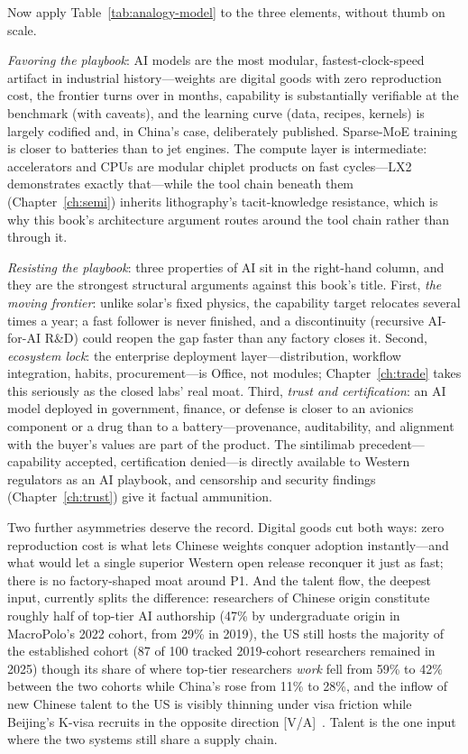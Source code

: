 Now apply Table~\ref{tab:analogy-model} to the three elements, without thumb on scale.

\emph{Favoring the playbook}: AI models are the most modular, fastest-clock-speed artifact in industrial history---weights are digital goods with zero reproduction cost, the frontier turns over in months, capability is substantially verifiable at the benchmark (with caveats), and the learning curve (data, recipes, kernels) is largely codified and, in China's case, deliberately published. Sparse-MoE training is closer to batteries than to jet engines. The compute layer is intermediate: accelerators and CPUs are modular chiplet products on fast cycles---LX2 demonstrates exactly that---while the tool chain beneath them (Chapter~\ref{ch:semi}) inherits lithography's tacit-knowledge resistance, which is why this book's architecture argument routes around the tool chain rather than through it.

\emph{Resisting the playbook}: three properties of AI sit in the right-hand column, and they are the strongest structural arguments against this book's title. First, \emph{the moving frontier}: unlike solar's fixed physics, the capability target relocates several times a year; a fast follower is never finished, and a discontinuity (recursive AI-for-AI R\&D) could reopen the gap faster than any factory closes it. Second, \emph{ecosystem lock}: the enterprise deployment layer---distribution, workflow integration, habits, procurement---is Office, not modules; Chapter~\ref{ch:trade} takes this seriously as the closed labs' real moat. Third, \emph{trust and certification}: an AI model deployed in government, finance, or defense is closer to an avionics component or a drug than to a battery---provenance, auditability, and alignment with the buyer's values are part of the product. The sintilimab precedent---capability accepted, certification denied---is directly available to Western regulators as an AI playbook, and censorship and security findings (Chapter~\ref{ch:trust}) give it factual ammunition.

Two further asymmetries deserve the record. Digital goods cut both ways: zero reproduction cost is what lets Chinese weights conquer adoption instantly---and what would let a single superior Western open release reconquer it just as fast; there is no factory-shaped moat around P1. And the talent flow, the deepest input, currently splits the difference: researchers of Chinese origin constitute roughly half of top-tier AI authorship (47\% by undergraduate origin in MacroPolo's 2022 cohort, from 29\% in 2019), the US still hosts the majority of the established cohort (87 of 100 tracked 2019-cohort researchers remained in 2025) though its share of where top-tier researchers \emph{work} fell from 59\% to 42\% between the two cohorts while China's rose from 11\% to 28\%, and the inflow of new Chinese talent to the US is visibly thinning under visa friction while Beijing's K-visa recruits in the opposite direction [V/A]~\cite{talent}. Talent is the one input where the two systems still share a supply chain.

